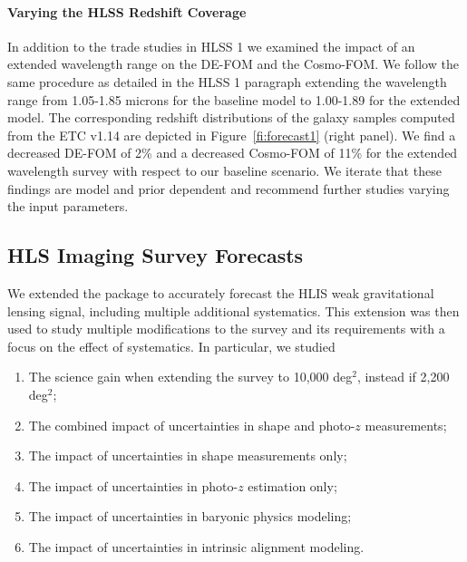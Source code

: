 
\paragraph{Varying the HLSS Redshift Coverage} In addition to the trade studies in HLSS 1 we examined the impact of an extended wavelength range on the DE-FOM and the Cosmo-FOM. We follow the same procedure as detailed in the HLSS 1 paragraph extending the wavelength range from 1.05-1.85 microns for the baseline model to 1.00-1.89 for the extended model. The corresponding redshift distributions of the galaxy samples computed from the ETC v1.14 are depicted in  Figure~\ref{fi:forecast1} (right panel). We find a decreased DE-FOM of 2\% and a decreased Cosmo-FOM of 11\% for the extended wavelength survey with respect to our baseline scenario. We iterate that these findings are model and prior dependent and recommend further studies varying the input parameters.

\subsection{HLS Imaging Survey Forecasts}
\label{sec:HLISforecasts}

\begin{summaryii}
We extended the \CoLi package to accurately forecast the HLIS weak gravitational lensing signal, including multiple additional systematics. This extension was then used to study multiple modifications to the survey and its requirements with a focus on the effect of systematics. In particular, we studied
\begin{enumerate}
  \item The science gain when extending the survey to 10,000 deg$^2$, instead if 2,200 deg$^2$;
  \item The combined impact of uncertainties in shape and photo-$z$ measurements;
  \item The impact of uncertainties in shape measurements only;
  \item The impact of uncertainties in photo-$z$ estimation only;
  \item The impact of uncertainties in baryonic physics modeling;
  \item The impact of uncertainties in intrinsic alignment modeling.
\end{enumerate}
\end{summaryii}

